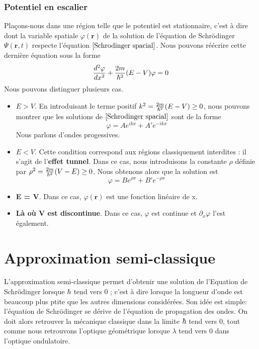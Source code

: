 \documentclass[../notesdecours]{subfiles}
\begin{document}
\subsubsection{Potentiel en escalier}
Plaçons-nous dans une région telle que le potentiel est stationnaire, c'est à dire dont la variable spatiale $\varphi (\bm{r})$ de la solution de l'équation de Schrödinger $\Psi (\bm{r},t)$ respecte l'équation $\eqref{Schrodinger spacial}$. Nous pouvons réécrire cette dernière équation sous la forme
\begin{equation*}
\frac{d^2 \varphi}{dx^2} + \frac{2m}{\hbar^2} (E-V)\varphi = 0
\end{equation*}
Nous pouvons distinguer plusieurs cas.
\begin{itemize}
\item \textbf{$E > V$}. En introduisant le terme positif $k^2 = \frac{2m}{\hbar^2} (E-V) \geq 0$, nous pouvons montrer que les solutions de $\eqref{Schrodinger spacial}$ sont de la forme
\begin{equation}
\varphi = Ae^{ikx} + A'e^{-ikx}
\end{equation}
Nous parlons d'ondes progessives.
\item \textbf{$E < V$}. Cette condition correspond aux régions classiquement interdites : il s'agit de l'\textbf{effet tunnel}. Dans ce cas, nous introduisons la constante $\rho$ définie par $\rho^2 = \frac{2m}{\hbar^2} (V-E) \geq 0$. Nous obtenons alors que la solution est
\begin{equation}
\varphi = Be^{\rho x} + B' e^{-\rho x}
\end{equation}
\item \textbf{E = V}. Dans ce cas, $\varphi (\bm{r})$ est une fonction linéaire de x.
\item \textbf{Là où V est discontinue}. Dans ce cas, $\varphi$ est continue et $\partial_x\varphi$ l'est également.
\end{itemize}
\section{Approximation semi-classique}
L'approximation semi-classique permet d'obtenir une solution de l'Equation de Schrödinger lorsque $\hbar$ tend vers 0 ; c'est à dire lorsque la longueur d'onde est beaucoup plus ptite que les autres dimensions considérées. Son idée est simple: l'équation de Schrödinger se dérive de l'équation de propagation des ondes. On doit alors retrouver la mécanique classique dans la limite $\hbar$ tend vers 0, tout comme nous retrouvons l'optique géométrique lorsque $\lambda$ tend vers 0 dans l'optique ondulatoire.\\
\end{document}
